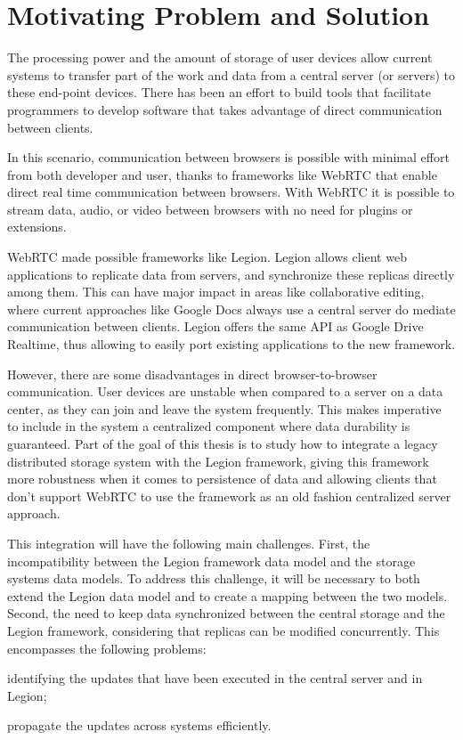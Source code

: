\section{Motivating Problem and Solution}
\label{sec:motivating_problem_and_solution}
The processing power and the amount of storage of user devices allow current systems to transfer part of the work and data from a central server (or servers) to these end-point devices. There has been an effort to build tools that facilitate programmers to develop software that takes advantage of direct communication between clients.\par
	In this scenario, communication between browsers is possible with minimal effort from both developer and user, thanks to frameworks like WebRTC that enable direct real time communication between browsers. With WebRTC it is possible to stream data, audio, or video between browsers with no need for plugins or extensions.\par
	WebRTC made possible frameworks like Legion. Legion allows client web applications to replicate data from servers, and synchronize these replicas directly among them. This can have major impact in areas like collaborative editing, where current approaches like Google Docs always use a central server do mediate communication between clients. Legion offers the same API as Google Drive Realtime, thus allowing to easily port existing applications to the new framework.\par
	However, there are some disadvantages in direct browser-to-browser communication. User devices are unstable when compared to a server on a data center, as they can join and leave the system frequently. This makes imperative to include in the system a centralized component where data durability is guaranteed. Part of the goal of this thesis is to study how to integrate a legacy distributed storage system with the Legion framework, giving this framework more robustness when it comes to persistence of data and allowing clients that don't support WebRTC to use the framework as an old fashion centralized server approach.\par
	This integration will have the following main challenges. First, the incompatibility  between the Legion framework data model and the storage systems data models. To address this challenge, it will be necessary to both extend the Legion data model and to create a mapping between the two models. Second, the need to keep data synchronized between the central storage and the Legion framework, considering that replicas can be modified concurrently. This encompasses the following problems: \begin{enumerate*}[(i)]
		\item identifying the updates that have been executed in the central server and in Legion; 
		\item propagate the updates across systems efficiently. 
	\end{enumerate*}
